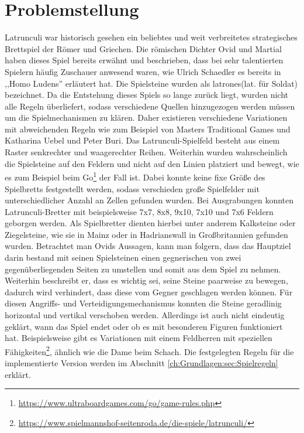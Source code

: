 \section{Problemstellung}
\label{ch:Einleitung:sec:Problemstellung}
Latrunculi war historisch gesehen ein beliebtes und weit verbreitetes strategisches Brettspiel der Römer und Griechen. Die römischen Dichter Ovid und Martial haben dieses Spiel bereits erwähnt und beschrieben, dass bei sehr talentierten Spielern häufig Zuschauer anwesend waren, wie Ulrich Schaedler es bereits in ,,Homo Ludens''\cite{homoLudens} erläutert hat. Die Spielsteine wurden als latrones(lat. für Soldat) 
bezeichnet. Da die Entstehung dieses Spiels so lange zurück liegt, wurden nicht alle Regeln überliefert, sodass verschiedene Quellen hinzugezogen werden müssen um die Spielmechanismen zu klären. Daher existieren verschiedene Variationen mit abweichenden Regeln wie zum Beispiel von Masters Traditional Games \cite{mastersgames} und Katharina Uebel und Peter Buri\cite{uebel}.
Das Latrunculi-Spielfeld besteht aus einem Raster senkrechter und waagerechter Reihen. Weiterhin wurden wahrscheinlich die Spielsteine auf den Feldern und nicht auf den Linien platziert und bewegt, wie es zum Beispiel beim Go\footnote[3]{\url{https://www.ultraboardgames.com/go/game-rules.php}} der Fall ist. Dabei konnte keine fixe Größe des Spielbretts festgestellt werden, sodass verschieden große Spielfelder mit unterschiedlicher Anzahl an Zellen gefunden wurden. Bei Ausgrabungen konnten Latrunculi-Bretter mit beispielsweise 7x7, 8x8, 9x10, 7x10 und 7x6 Feldern geborgen werden. Als Spielbretter dienten hierbei unter anderem Kalksteine oder Ziegelsteine, wie sie in Mainz oder in Hadrianswall in Großbritannien gefunden wurden\cite{homoLudens}. Betrachtet man Ovids Aussagen, kann man folgern, dass das Hauptziel darin bestand mit seinen Spielsteinen einen gegnerischen von zwei gegenüberliegenden Seiten zu umstellen und somit aus dem Spiel zu nehmen. Weiterhin beschreibt er, dass es wichtig sei, seine Steine paarweise zu bewegen, dadurch wird verhindert, dass diese vom Gegner geschlagen werden können. Für diesen Angriffs- und Verteidigungsmechanismus konnten die Steine geradlinig horizontal und vertikal verschoben werden. Allerdings ist auch nicht eindeutig geklärt, wann das Spiel endet oder ob es mit besonderen Figuren funktioniert hat. Beispielsweise gibt es Variationen mit einem Feldherren mit speziellen Fähigkeiten\footnote[4]{\url{https://www.spielmannshof-seitenroda.de/die-spiele/latrunculi/}}, ähnlich wie die Dame beim Schach. Die festgelegten Regeln für die implementierte Version werden im Abschnitt \ref{ch:Grundlagen:sec:Spielregeln} erklärt.

